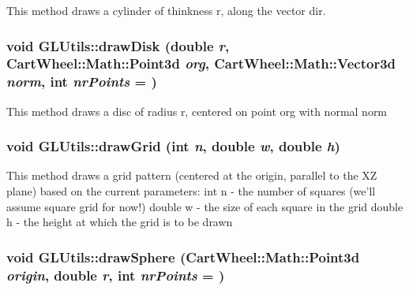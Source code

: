 This method draws a cylinder of thinkness r, along the vector dir. \hypertarget{classCartWheel_1_1GL_1_1GLUtils_a7df28e360c5d891833d4c519fee1c357}{
\subsubsection[{drawDisk}]{\setlength{\rightskip}{0pt plus 5cm}void GLUtils::drawDisk (double {\em r}, \/  {\bf CartWheel::Math::Point3d} {\em org}, \/  {\bf CartWheel::Math::Vector3d} {\em norm}, \/  int {\em nrPoints} = {})}}
\label{classCartWheel_1_1GL_1_1GLUtils_a7df28e360c5d891833d4c519fee1c357}
This method draws a disc of radius r, centered on point org with normal norm \hypertarget{classCartWheel_1_1GL_1_1GLUtils_a3a90981814aeb1cf3d560a3acd5d8f88}{
\subsubsection[{drawGrid}]{\setlength{\rightskip}{0pt plus 5cm}void GLUtils::drawGrid (int {\em n}, \/  double {\em w}, \/  double {\em h})}}
\label{classCartWheel_1_1GL_1_1GLUtils_a3a90981814aeb1cf3d560a3acd5d8f88}
This method draws a grid pattern (centered at the origin, parallel to the XZ plane) based on the current parameters: int n -\/ the number of squares (we'll assume square grid for now!) double w -\/ the size of each square in the grid double h -\/ the height at which the grid is to be drawn \hypertarget{classCartWheel_1_1GL_1_1GLUtils_a57e1b070853a240d42fd158c0865ec34}{
\subsubsection[{drawSphere}]{\setlength{\rightskip}{0pt plus 5cm}void GLUtils::drawSphere ({\bf CartWheel::Math::Point3d} {\em origin}, \/  double {\em r}, \/  int {\em nrPoints} = {})}}
